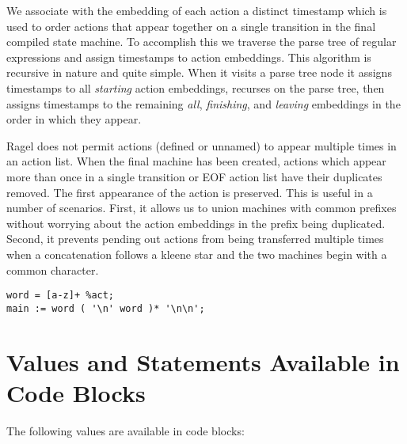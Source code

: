 \documentclass[letterpaper,11pt,oneside]{book}
\newcommand{\verbspace}{\vspace{10pt}}
\begin{document}
We associate with the embedding of each action a distinct timestamp which is
used to order actions that appear together on a single transition in the final
compiled state machine. To accomplish this we traverse the parse tree of
regular expressions and assign timestamps to action embeddings. This algorithm
is recursive in nature and quite simple. When it visits a parse tree node it
assigns timestamps to all {\em starting} action embeddings, recurses on the
parse tree, then assigns timestamps to the remaining {\em all}, {\em
finishing}, and {\em leaving} embeddings in the order in which they appear.

Ragel does not permit actions (defined or unnamed) to appear multiple times in
an action list.  When the final machine has been created, actions which appear
more than once in a single transition or EOF action list have their duplicates
removed. The first appearance of the action is preserved. This is useful in a
number of scenarios.  First, it allows us to union machines with common
prefixes without worrying about the action embeddings in the prefix being
duplicated.  Second, it prevents pending out actions from being transferred multiple times
when a concatenation follows a kleene star and the two machines begin with a common
character.

\verbspace
\begin{verbatim}
word = [a-z]+ %act;
main := word ( '\n' word )* '\n\n';
\end{verbatim}

\section{Values and Statements Available in Code Blocks}
\label{vals}

\noindent The following values are available in code blocks:
\end{document}
